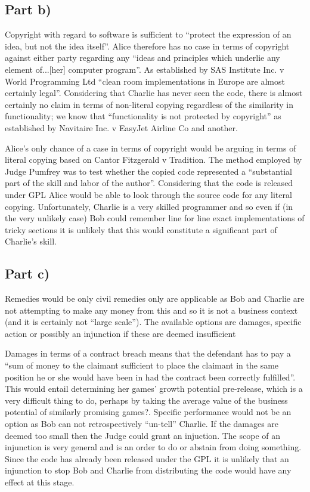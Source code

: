 \documentclass[a4paper, 6pt]{article}
\begin{document}
\subsection{Part b)}
 Copyright with regard to software is sufficient to ``protect the expression of an idea, but not the idea itself''.
 Alice therefore has no case in terms of copyright against either party regarding any ``ideas and principles which underlie any element of...[her] computer program''.
 As established by SAS Institute Inc. v World Programming Ltd ``clean room implementations in Europe are almost certainly legal''.
 Considering that Charlie has never seen the code, there is almost certainly no claim in terms of non-literal copying regardless of the similarity in functionality;
 we know that ``functionality is not protected by copyright'' as established by Navitaire Inc. v EasyJet Airline Co and another.

 Alice's only chance of a case in terms of copyright would be arguing in terms of literal copying based on Cantor Fitzgerald v Tradition.
 The method employed by Judge Pumfrey was to test whether the copied code represented a ``substantial part of the skill and labor of the author''.
 Considering that the code is released under GPL Alice would be able to look through the source code for any literal copying. Unfortunately, Charlie is a very skilled 
 programmer and so even if (in the very unlikely case) Bob could remember line for line exact implementations of tricky sections it is unlikely that this would constitute
 a significant part of Charlie's skill. 

\subsection{Part c)}
 Remedies would be only civil remedies only are applicable as Bob and Charlie are not attempting to make any money from this and so it is not a business context (and it is certainly not ``large scale'').
 The available options are damages, specific action or possibly an injunction if these are deemed insufficient

 Damages in terms of a contract breach means that the defendant has to pay a ``sum of money to the claimant sufficient to place the claimant in the same position he or she would have been in had the contract been correctly fulfilled''.
 This would entail determining her games' growth potential pre-release, which is a very difficult thing to do, perhaps by taking the average value of the business potential of similarly promising games?.
 Specific performance would not be an option as Bob can not retrospectively ``un-tell'' Charlie.
 If the damages are deemed too small then the Judge could grant an injuction. The scope of an injunction is very general and is an order to do or abstain from doing something. Since the code has already been released under the GPL it is unlikely
 that an injunction to stop Bob and Charlie from distributing the code would have any effect at this stage. 
\end{document}
